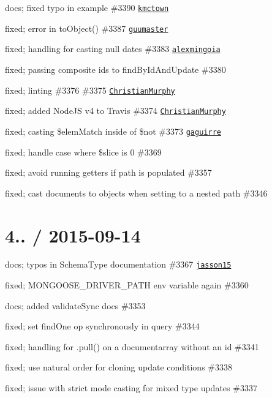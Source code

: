 \begin{DoxyItemize}
\item docs; fixed typo in example \#3390 \href{https://github.com/kmctown}{\tt kmctown}
\item fixed; error in to\+Object() \#3387 \href{https://github.com/guumaster}{\tt guumaster}
\item fixed; handling for casting null dates \#3383 \href{https://github.com/alexmingoia}{\tt alexmingoia}
\item fixed; passing composite ids to {\ttfamily find\+By\+Id\+And\+Update} \#3380
\item fixed; linting \#3376 \#3375 \href{https://github.com/ChristianMurphy}{\tt Christian\+Murphy}
\item fixed; added Node\+JS v4 to Travis \#3374 \href{https://github.com/ChristianMurphy}{\tt Christian\+Murphy}
\item fixed; casting \$elem\+Match inside of \$not \#3373 \href{https://github.com/gaguirre}{\tt gaguirre}
\item fixed; handle case where \$slice is 0 \#3369
\item fixed; avoid running getters if path is populated \#3357
\item fixed; cast documents to objects when setting to a nested path \#3346
\end{DoxyItemize}

\section*{4.. / 2015-\/09-\/14 }


\begin{DoxyItemize}
\item docs; typos in Schema\+Type documentation \#3367 \href{https://github.com/jasson15}{\tt jasson15}
\item fixed; M\+O\+N\+G\+O\+O\+S\+E\+\_\+\+D\+R\+I\+V\+E\+R\+\_\+\+P\+A\+TH env variable again \#3360
\item docs; added validate\+Sync docs \#3353
\item fixed; set find\+One op synchronously in query \#3344
\item fixed; handling for {\ttfamily .pull()} on a documentarray without an id \#3341
\item fixed; use natural order for cloning update conditions \#3338
\item fixed; issue with strict mode casting for mixed type updates \#3337
\end{DoxyItemize}

